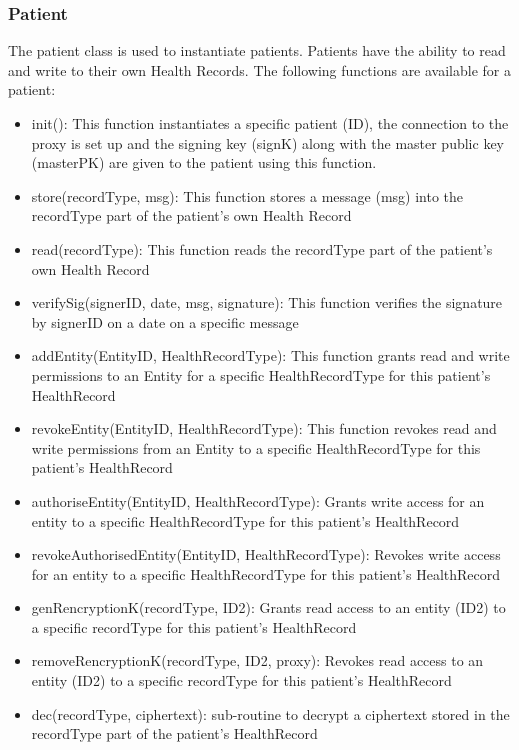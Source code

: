 \documentclass[]{article}
\begin{document}
\begin{itemize}
\subsubsection{Patient}
The patient class is used to instantiate patients. Patients have the ability to read and write to their own Health Records. The following functions are available for a patient:
\begin{itemize}
\item init(): This function instantiates a specific patient (ID), the connection to the proxy is set up and the signing key (signK) along with the master public key (masterPK) are given to the patient using this function.
\item store(recordType, msg): This function stores a message (msg) into the recordType part of the patient's own Health Record
\item read(recordType): This function reads the recordType part of the patient's own Health Record
\item verifySig(signerID, date, msg, signature): This function verifies the signature by signerID on a date on a specific message
\item addEntity(EntityID, HealthRecordType): This function grants read and write permissions to an Entity for a specific HealthRecordType for this patient's HealthRecord
\item revokeEntity(EntityID, HealthRecordType): This function revokes read and write permissions from an Entity to a specific HealthRecordType for this patient's HealthRecord
\item authoriseEntity(EntityID, HealthRecordType): Grants write access for an entity to a specific HealthRecordType for this patient's HealthRecord
\item revokeAuthorisedEntity(EntityID, HealthRecordType): Revokes write access for an entity to a specific HealthRecordType for this patient's HealthRecord
\item genRencryptionK(recordType, ID2): Grants read access to an entity (ID2) to a specific recordType for this patient's HealthRecord
\item removeRencryptionK(recordType, ID2, proxy): Revokes read access to an entity (ID2) to a specific recordType for this patient's HealthRecord
\item dec(recordType, ciphertext): sub-routine to decrypt a ciphertext stored in the recordType part of the patient's HealthRecord
\end{itemize}

\end{itemize}
\end{document}

